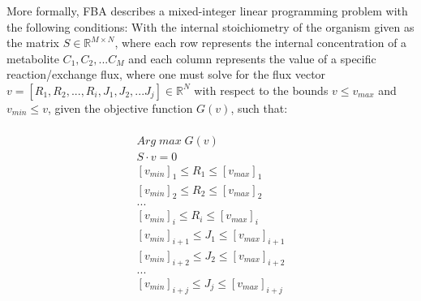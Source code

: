 More formally, FBA describes a mixed-integer linear programming problem with the following conditions: With the internal stoichiometry of the organism given as the matrix $S \in \mathbb{R}^{M \times N}$, where each row represents the internal concentration of a metabolite $C_1, C_2, ... C_M$ and each column represents the value of a specific reaction/exchange flux, where one must solve for the flux vector $v = [R_1, R_2, ..., R_i, J_1, J_2, ... J_j] \in \mathbb{R}^N$ with respect to the bounds $v \leq v_{max}$ and $v_{min} \leq v$, given the objective function $G(v)$, such that:

\begin{multline*}
    \\
    Arg \; max \; G(v)\\
    S \cdot v = 0 \\
    [v_{min}]_1 \leq R_1 \leq [v_{max}]_1 \\
    [v_{min}]_2 \leq R_2 \leq [v_{max}]_2 \\
    ... \\
    [v_{min}]_i \leq R_i \leq [v_{max}]_i \\
    [v_{min}]_{i+1} \leq J_1 \leq [v_{max}]_{i+1}\\
    [v_{min}]_{i+2} \leq J_2 \leq [v_{max}]_{i+2} \\
    ...\\
    [v_{min}]_{i+j} \leq J_j \leq [v_{max}]_{i+j} \\
\end{multline*}



